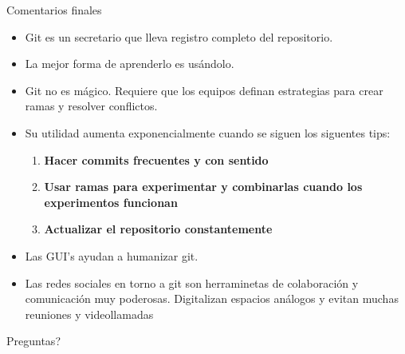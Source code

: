 \documentclass[10pt, aspectratio=169]{beamer}
\begin{document}
\begin{frame}[<+->]{Comentarios finales}
	\begin{itemize}
		\item Git es un secretario que lleva registro completo del repositorio.
		\item La mejor forma de aprenderlo es usándolo.
		\item Git no es mágico. Requiere que los equipos definan estrategias para crear ramas y resolver conflictos.
		\vfill\item Su utilidad aumenta exponencialmente cuando se siguen los siguentes tips:
		\begin{enumerate}
			\vfill\item \textbf{Hacer commits frecuentes y con sentido}
			\vfill\item \textbf{Usar ramas para experimentar y combinarlas cuando los experimentos funcionan}
			\vfill\item \textbf{Actualizar el repositorio constantemente}
		\end{enumerate}
		\vfill\item Las GUI's ayudan a humanizar git.
		\vfill\item Las redes sociales en torno a git son herraminetas de colaboración y comunicación muy poderosas. \textcolor{UBCgrey}{Digitalizan espacios análogos y evitan muchas reuniones y videollamadas}
	\end{itemize}
\end{frame}

\begin{frame}[standout]{\secname}
	Preguntas?
\end{frame}
\end{document}
